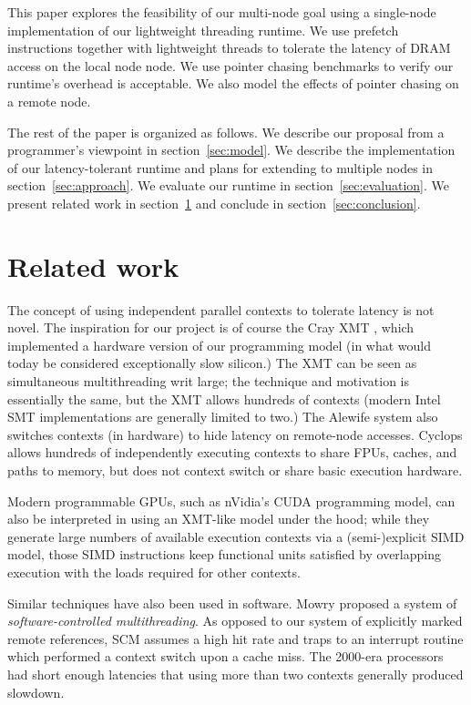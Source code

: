 \documentclass{acm_proc_article-sp}
\begin{document}
This paper explores the feasibility of our multi-node goal using a
single-node implementation of our lightweight threading runtime. We
use prefetch instructions together with lightweight threads to
tolerate the latency of DRAM access on the local node node. We use
pointer chasing benchmarks to verify our runtime's overhead is
acceptable. We also model the effects of pointer chasing on a remote
node.

The rest of the paper is organized as follows. We describe our
proposal from a programmer's viewpoint in section~\ref{sec:model}. We
describe the implementation of our latency-tolerant runtime and plans
for extending to multiple nodes in section~\ref{sec:approach}. We
evaluate our runtime in section~\ref{sec:evaluation}.  We present
related work in section~\ref{sec:related} and conclude in
section~\ref{sec:conclusion}.

\section{Related work}
\label{sec:related}
The concept of using independent parallel contexts to tolerate latency
is not novel.  The inspiration for our project is of course the Cray
XMT \cite{feo-xmt}, which implemented a hardware version of our
programming model (in what would today be considered exceptionally
slow silicon.)  The XMT can be seen as simultaneous multithreading
\cite{tullsen-smt} writ large; the technique and motivation is
essentially the same, but the XMT allows hundreds of contexts (modern
Intel SMT implementations are generally limited to two.) The Alewife
system \cite{agarwal-alewife} also switches contexts (in hardware) to
hide latency on remote-node accesses.  Cyclops \cite{almasi-cyclops}
allows hundreds of independently executing contexts to share FPUs,
caches, and paths to memory, but does not context switch or share
basic execution hardware.  

Modern programmable GPUs, such as nVidia's CUDA programming model, can also be interpreted in using an XMT-like
model under the hood;
while they generate large numbers of available execution contexts via
a (semi-)explicit SIMD model, those SIMD instructions keep functional
units satisfied by overlapping execution with the loads required for
other contexts.

Similar techniques have also been used in software.  Mowry proposed a system \cite{mowry-scm} of \emph{software-controlled
  multithreading}.  As opposed to our system of explicitly marked
remote references, SCM assumes a high hit rate and traps to an
interrupt routine which performed a context switch upon a cache miss.  The 2000-era processors had
short enough latencies that using more than two contexts generally
produced slowdown.
\end{document}
